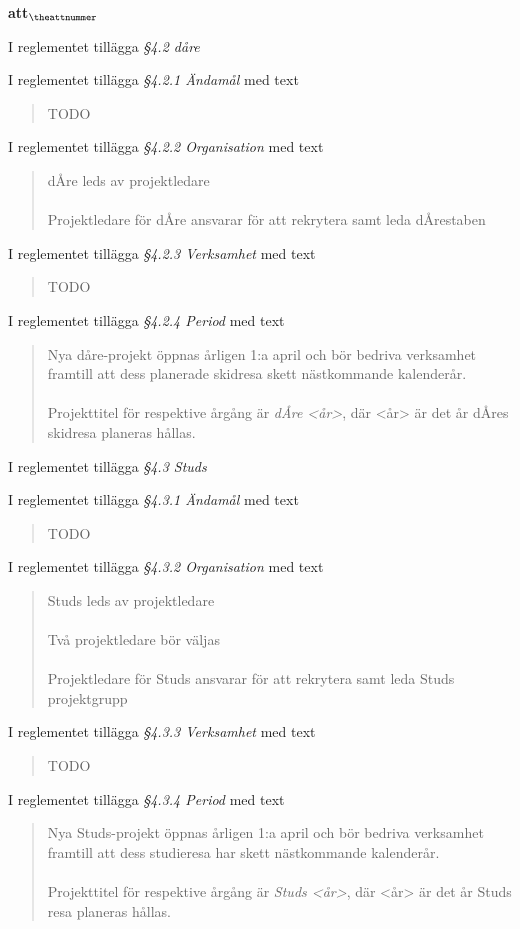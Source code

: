 \documentclass[a4paper]{article}
\begin{document}
\begin{list}{\bf att$_{\theattnummer}$}{}

\item I reglementet tillägga \textit{\S4.2 dåre}
\item I reglementet tillägga \textit{\S4.2.1 Ändamål} med text \begin{quote} TODO \end{quote}
\item I reglementet tillägga \textit{\S4.2.2 Organisation} med text \begin{quote} dÅre leds av projektledare\\\\Projektledare för dÅre ansvarar för att rekrytera samt leda dÅrestaben \end{quote}
\item I reglementet tillägga \textit{\S4.2.3 Verksamhet} med text \begin{quote} TODO \end{quote}
\item I reglementet tillägga \textit{\S4.2.4 Period} med text \begin{quote} Nya dåre-projekt öppnas årligen 1:a april och bör bedriva verksamhet framtill att dess planerade skidresa skett nästkommande kalenderår.\\\\Projekttitel för respektive årgång är \textit{dÅre <år>}, där <år> är det år dÅres skidresa planeras hållas.\end{quote}


\item I reglementet tillägga \textit{\S4.3 Studs}
\item I reglementet tillägga \textit{\S4.3.1 Ändamål} med text \begin{quote} TODO \end{quote}
\item I reglementet tillägga \textit{\S4.3.2 Organisation} med text \begin{quote} Studs leds av projektledare\\\\Två projektledare bör väljas\\\\Projektledare för Studs ansvarar för att rekrytera samt leda Studs projektgrupp \end{quote}
\item I reglementet tillägga \textit{\S4.3.3 Verksamhet} med text \begin{quote} TODO \end{quote}
\item I reglementet tillägga \textit{\S4.3.4 Period} med text \begin{quote} Nya Studs-projekt öppnas årligen 1:a april och bör bedriva verksamhet framtill att dess studieresa har skett nästkommande kalenderår.\\\\Projekttitel för respektive årgång är \textit{Studs <år>}, där <år> är det år Studs resa planeras hållas.\end{quote}


\end{list}
\end{document}
